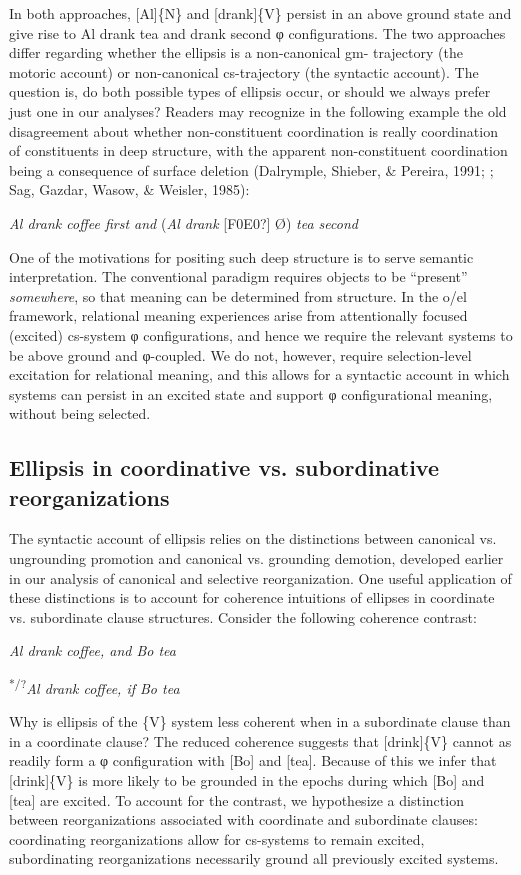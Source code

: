   In both approaches, [Al]\{N\} and [drank]\{V\} persist in an above ground state and give rise to {\textbar}Al drank tea{\textbar} and {\textbar}drank second{\textbar} φ configurations. The two approaches differ regarding whether the ellipsis is a non-canonical gm- trajectory (the motoric account) or non-canonical cs-trajectory (the syntactic account). The question is, do both possible types of ellipsis occur, or should we always prefer just one in our analyses? Readers may recognize in the following example the old disagreement about whether non-constituent coordination is really coordination of constituents in deep structure, with the apparent non-constituent coordination being a consequence of surface deletion (Dalrymple, Shieber, \& Pereira, 1991; \citealt{Merchant2001}; Sag, Gazdar, Wasow, \& Weisler, 1985): 

\textit{Al drank coffee first and} (\textit{Al drank} [F0E0?] Ø) \textit{tea second}

  One of the motivations for positing such deep structure is to serve semantic interpretation. The conventional paradigm requires objects to be “present” \textit{somewhere}, so that meaning can be determined from structure. In the o/el framework, relational meaning experiences arise from attentionally focused (excited) cs-system φ configurations, and hence we require the relevant systems to be above ground and φ-coupled. We do not, however, require selection-level excitation for relational meaning, and this allows for a syntactic account in which systems can persist in an excited state and support φ configurational meaning, without being selected. 

\subsection{Ellipsis in coordinative vs. subordinative reorganizations}

The syntactic account of ellipsis relies on the distinctions between canonical vs. ungrounding promotion and canonical vs. grounding demotion, developed earlier in our analysis of canonical and selective reorganization. One useful application of these distinctions is to account for coherence intuitions of ellipses in coordinate vs. subordinate clause structures. Consider the following coherence contrast:

    \textit{Al drank coffee, and Bo tea}

    \textsuperscript{*/?}\textit{Al drank coffee, if Bo tea}

  Why is ellipsis of the \{V\} system less coherent when in a subordinate clause than in a coordinate clause? The reduced coherence suggests that [drink]\{V\} cannot as readily form a φ configuration with [Bo] and [tea]. Because of this we infer that [drink]\{V\} is more likely to be grounded in the epochs during which [Bo] and [tea] are excited. To account for the contrast, we hypothesize a distinction between reorganizations associated with coordinate and subordinate clauses: coordinating reorganizations allow for cs-systems to remain excited, subordinating reorganizations necessarily ground all previously excited systems. 

